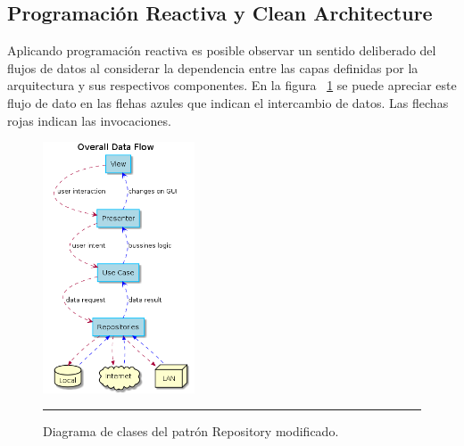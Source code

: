 \subsection{Programación Reactiva y Clean Architecture}
Aplicando programación reactiva es posible observar un sentido deliberado del flujos de datos al considerar la dependencia entre las capas definidas por la arquitectura y sus respectivos componentes.
En la figura ~\ref{fig:uml_infflow_modif_repository} se puede apreciar este flujo de dato en las flehas azules que indican el intercambio de datos. Las flechas rojas indican las invocaciones.
\begin{figure}[htbp]
	\centering
	\includegraphics[width=0.4\textwidth]{Figures/uml_inf-flow_clean_reactive.png}
	\rule{35em}{1pt}
	\caption[Modified Repository Pattern Class Diagram]{Diagrama de clases del patrón Repository modificado.}
	\label{fig:uml_infflow_modif_repository}
\end{figure}